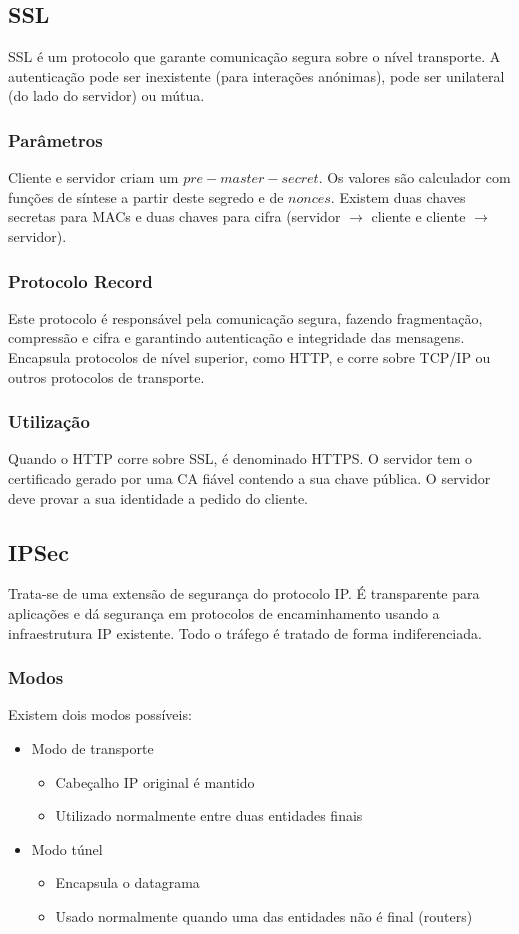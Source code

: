 \documentclass[10pt,a4paper]{report}
\begin{document}
\subsection{SSL}
SSL é um protocolo que garante comunicação segura sobre o nível transporte. A autenticação pode ser inexistente (para interações anónimas), pode ser unilateral (do lado do servidor) ou mútua.
\subsubsection{Parâmetros}
Cliente e servidor criam um $pre-master-secret$. Os valores são calculador com funções de síntese a partir deste segredo e de $nonces$. Existem duas chaves secretas para MACs e duas chaves para cifra (servidor $\rightarrow$ cliente e cliente $\rightarrow$ servidor).
\subsubsection{Protocolo Record}
Este protocolo é responsável pela comunicação segura, fazendo fragmentação, compressão e cifra e garantindo autenticação e integridade das mensagens. Encapsula protocolos de nível superior, como HTTP, e corre sobre TCP/IP ou outros protocolos de transporte.
\subsubsection{Utilização}
Quando o HTTP corre sobre SSL, é denominado HTTPS. O servidor tem o certificado gerado por uma CA fiável contendo a sua chave pública. O servidor deve provar a sua identidade a pedido do cliente.
\subsection{IPSec}
Trata-se de uma extensão de segurança do protocolo IP. É transparente para aplicações e dá segurança em protocolos de encaminhamento usando a infraestrutura IP existente. Todo o tráfego é tratado de forma indiferenciada.
\subsubsection{Modos}
Existem dois modos possíveis:
\begin{itemize}
\item Modo de transporte
\begin{itemize}
\item Cabeçalho IP original é mantido
\item Utilizado normalmente entre duas entidades finais
\end{itemize}
\item Modo túnel
\begin{itemize}
\item Encapsula o datagrama
\item Usado normalmente quando uma das entidades não é final (routers)
\end{itemize}
\end{itemize}
\end{document}
